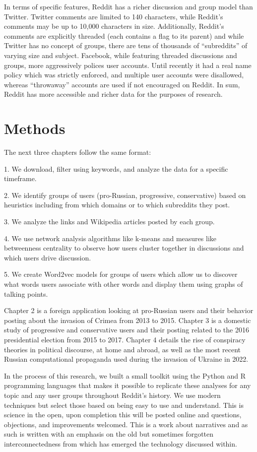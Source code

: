 \documentclass[doublespacing]{utdthesis}
\begin{document}
In terms of specific features, Reddit has a richer discussion and group model than Twitter.
Twitter comments are limited to 140 characters, while Reddit’s comments may be up to 10,000 characters in size.
Additionally, Reddit’s comments are explicitly threaded (each contains a flag to its parent) and while Twitter has no concept of groups, there are tens of thousands of ``subreddits'' of varying size and subject.
Facebook, while featuring threaded discussions and groups, more aggressively polices user accounts.
Until recently it had a real name policy which was strictly enforced, and multiple user accounts were disallowed, whereas ``throwaway'' accounts are used if not encouraged on Reddit.
In sum, Reddit has more accessible and richer data for the purposes of
research.

\section{Methods}

The next three chapters follow the same format: 

1. We download, filter using keywords, and analyze the data for a specific timeframe.

2. We identify groups of users (pro-Russian, progressive, conservative) based on heuristics including from which domains or to which subreddits they post.

3. We analyze the links and Wikipedia articles posted by each group.

4. We use network analysis algorithms like k-means and measures like betweenness centrality to observe how users cluster together in discussions and which users drive discussion.

5. We create Word2vec models for groups of users which allow us to discover what words users associate with other words and display them using graphs of talking points.

Chapter 2 is a foreign application looking at pro-Russian users and their behavior posting about the invasion of Crimea from 2013 to 2015. 
Chapter 3 is a domestic study of progressive and conservative users and their posting related to the 2016 presidential election from 2015 to 2017.
Chapter 4 details the rise of conspiracy theories in political discourse, at home and abroad, as well as  the most recent Russian computational propaganda used during the invasion of Ukraine in 2022.

In the process of this research, we built a small toolkit using the Python and R programming languages that makes it possible to replicate these analyses for any topic and any user groups throughout Reddit's history.
We use modern techniques but select those based on being easy to use and understand.
This is science in the open, upon completion this will be posted online and questions, objections, and improvements welcomed.
This is a work about narratives and as such is written with an emphasis on the old but sometimes forgotten interconnectedness from which has emerged the technology discussed within.
\end{document}
